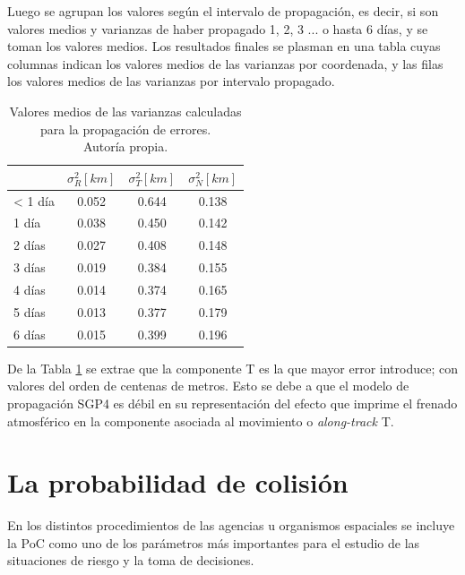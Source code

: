 Luego se agrupan los valores seg\'un el intervalo de propagaci\'on, es decir, si son valores medios y varianzas de haber propagado 1, 2, 3 ... o hasta 6 d\'ias, y se toman los valores medios. Los resultados finales se plasman en una tabla cuyas columnas indican los valores medios de las varianzas por coordenada, y las filas los valores medios de las varianzas por intervalo propagado.\\

\begin{table}[!h]
\caption[Tabla con los valores medios para la propagaci\'on de errores.]{Valores medios de las varianzas calculadas\\ para la propagaci\'on de errores.\\ Autor\'ia propia.}
\begin{tabular}{lccc}
\hline \hline
\rowcolor{yellow!35}
&$\sigma^{2}_R [km]$ &$\sigma^{2}_T [km]$ &$\sigma^{2}_N [km]$\\
\hline \hline
< 1 d\'ia & 0.052& 0.644& 0.138\\
\hline
1 d\'ia & 0.038& 0.450& 0.142\\
\hline
2 d\'ias & 0.027& 0.408& 0.148\\
\hline
3 d\'ias & 0.019& 0.384& 0.155\\
\hline
4 d\'ias & 0.014& 0.374& 0.165\\
\hline
5 d\'ias & 0.013& 0.377& 0.179\\
\hline
6 d\'ias & 0.015& 0.399& 0.196\\
\hline
\end{tabular}
\label{tab:resultatabla0}
\end{table}

De la Tabla \ref{tab:resultatabla0} se extrae que la componente T es la que mayor error introduce; con valores del orden de centenas de metros. Esto se debe a que el modelo de propagaci\'on SGP4 es d\'ebil en su representaci\'on del efecto que imprime el frenado atmosf\'erico en la componente asociada al movimiento o {\it{along-track}} T. 

\section{La probabilidad de colisi\'on}\label{sec:probcol}

En los distintos procedimientos de las agencias u organismos espaciales se incluye la PoC como uno de los par\'ametros m\'as importantes para el estudio de las situaciones de riesgo y la toma de decisiones.

